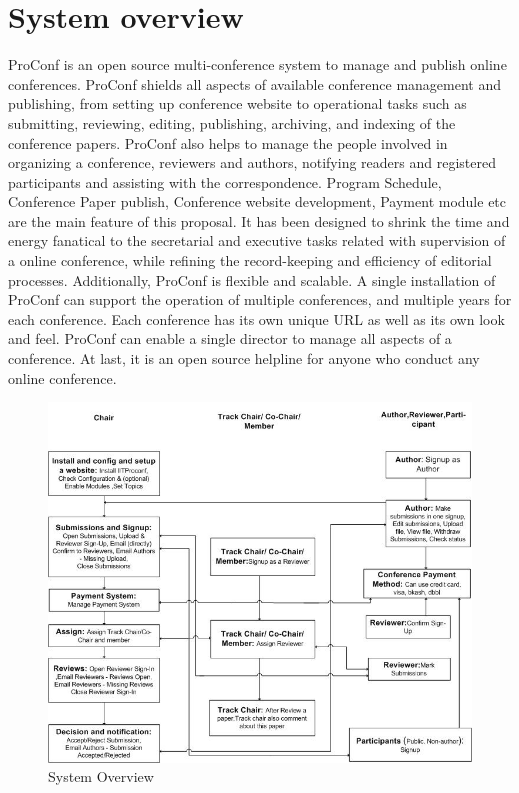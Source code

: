 \section{System overview}
 ProConf is an open source multi-conference system to manage and publish online conferences. ProConf shields all aspects of available conference management and publishing, from setting up conference website to operational tasks such as submitting, reviewing, editing, publishing, archiving, and indexing of the conference papers. ProConf also helps to manage the people involved in organizing a conference, reviewers and authors, notifying readers and registered participants and assisting with the correspondence. Program Schedule, Conference Paper publish, Conference website development, Payment module etc are the main feature of this proposal. It has been designed to shrink the time and energy fanatical to the secretarial and executive tasks related with supervision of a online conference, while refining the record-keeping and efficiency of editorial processes.\newline
Additionally, ProConf is flexible and scalable. A single installation of ProConf can support the operation of multiple conferences, and multiple years for each conference. Each conference has its own unique URL as well as its own look and feel. ProConf can enable a single director to manage all aspects of a conference. At last, it is an open source helpline for anyone who conduct any online conference.


\begin{figure}[h!]
\centering
  \includegraphics[width=5in]{pic/review}
  \caption{System Overview}\label{system}
\end{figure}


